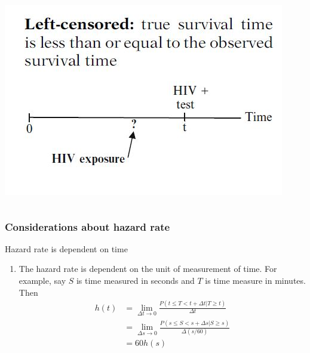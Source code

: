 \documentclass{beamer}
\theoremstyle{definition}
\begin{document}
\begin{frame}
\begin{columns}
\begin{column}{0.48\textwidth}
              \vspace{-20pt}
         \includegraphics[width =\textwidth]{Ch1-LeftCensor.JPG}
    \end{column}
\end{columns}
\end{frame}
\begin{frame} \frametitle{Considerations about hazard rate}
\begin{block}{Hazard rate is dependent on time}
\begin{enumerate}
\item The hazard rate is dependent on the unit of measurement of time. For example, say $S$ is time measured in seconds and $T$ is time measure in minutes. Then 
\begin{align*}
h(t) & = \lim_{\Delta t \to 0} \frac{P( t \leq T < t+ \Delta t|T \ge t)}{\Delta t} \\
 & = \lim_{\Delta s \to 0} \frac{P( s \leq S < s + \Delta s |S \ge s)}{\Delta (s/60)} \\
 &  = 60h(s) 
\end{align*}
\end{enumerate}
\end{block}
\end{frame}
\end{document}
